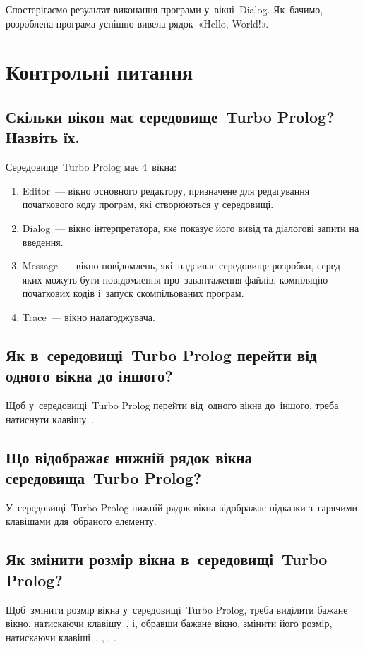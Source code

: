 \documentclass[
	a4paper,
	oneside,
	BCOR = 10mm,
	DIV = 12,
	12pt,
	headings = normal,
]{scrartcl}
\begin{document}
		Спостерігаємо результат виконання програми у~вікні~\textenglish{Dialog}. Як~бачимо, розроблена програма успішно вивела рядок~«\textenglish{Hello, World!}».

	\section{Контрольні питання}
		\subsection{Скільки вікон має середовище~\textenglish{Turbo Prolog}? Назвіть їх.}
			Середовище~\textenglish{Turbo Prolog} має 4~вікна: 
			\begin{enumerate}
				\item \textenglish{Editor}~— вікно основного редактору, призначене для редагування початкового коду програм, які створюються у середовищі. 
				\item \textenglish{Dialog}~— вікно інтерпретатора, яке показує його вивід та діалогові запити на введення. 
				\item \textenglish{Message}~— вікно повідомлень, які~надсилає середовище розробки, серед яких можуть бути повідомлення про~завантаження файлів, компіляцію початкових кодів і~запуск скомпільованих програм. 
				\item \textenglish{Trace}~— вікно налагоджувача. 
			\end{enumerate}

		\subsection{Як в~середовищі~\textenglish{Turbo Prolog} перейти від одного вікна до іншого?}
			Щоб у~середовищі~\textenglish{Turbo Prolog} перейти від~одного вікна до~іншого, треба натиснути клавішу~.

		\subsection{Що відображає нижній рядок вікна середовища~\textenglish{Turbo Prolog}?}
			У~середовищі~\textenglish{Turbo Prolog} нижній рядок вікна відображає підказки з~гарячими клавішами для~обраного елементу.

		\subsection{Як змінити розмір вікна в~середовищі~\textenglish{Turbo Prolog}?}
			Щоб~змінити розмір вікна у~середовищі~\textenglish{Turbo Prolog}, треба виділити бажане вікно, натискаючи клавішу~, і, обравши бажане вікно, змінити його розмір, натискаючи клавіші~, , , .
\end{document}
